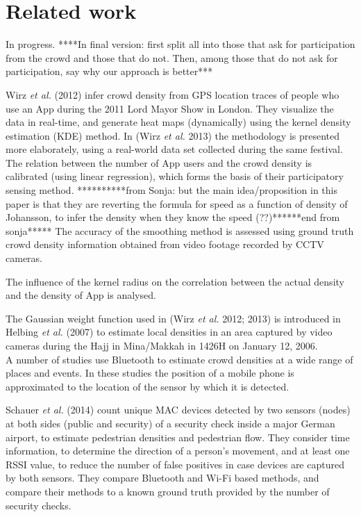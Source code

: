 \documentclass[10pt,a4paper]{article}
\begin{document}
\section{Related work}\label{sec:relatedwork}
In progress. 
****In final version: first split all into those that ask for participation from the crowd	 and those that do not. Then, among those that do not ask for participation, say why our approach is better***

Wirz \textit{et al.} (2012) \cite{wirz:1} infer crowd density from GPS location traces of people who use an App during the 2011 Lord Mayor Show in London. They visualize the data in real-time, and generate heat maps (dynamically) using the kernel density estimation (KDE) method. In (Wirz \textit{et al.} 2013) \cite{wirz:2} the methodology is presented more elaborately, using a real-world data set collected during the same festival. The relation between the number of App users and the crowd density is calibrated (using linear regression), which forms the basis of their participatory sensing method. **********from Sonja: but the main idea/proposition in this paper is that they are reverting the formula for speed as a function of density of Johansson, to infer the density when they know the speed (??)******end from sonja*****
The accuracy of the smoothing method is assessed using ground truth crowd density information obtained from video footage recorded by CCTV cameras. 

The influence of the kernel radius on the correlation between the actual density and the density of App is analysed.

The Gaussian weight function used in (Wirz \textit{et al.} 2012; 2013) \cite{wirz:1}\cite{wirz:2} is introduced in Helbing \textit{et al.} (2007) \cite{helbing:1} to estimate local densities in an area captured by video cameras during the Hajj in Mina/Makkah in 1426H on January 12, 2006.\\

A number of studies use Bluetooth to estimate crowd densities at a wide range of places and events.
In these studies the position of a mobile phone is approximated to the location of the sensor by which it is detected.

Schauer \textit{et al.} (2014) \cite{schauer:1} count unique MAC devices detected by two sensors (nodes) at both sides (public and security) of a security check inside a major German airport, to estimate pedestrian densities and pedestrian flow. They consider time information, to determine the direction of a person's movement, and at least one RSSI value, to reduce the number of false positives in case devices are captured by both sensors. They compare Bluetooth and Wi-Fi based methods, and compare their methods to a known ground truth provided by the number of security checks.
\end{document}
